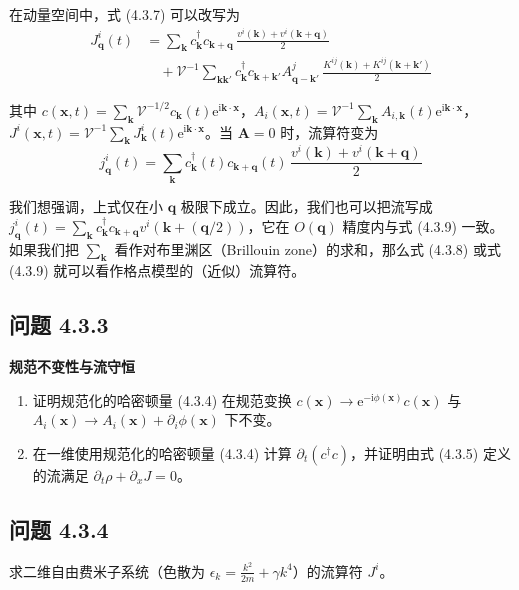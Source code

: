 在动量空间中，式 (4.3.7) 可以改写为
\begin{align*}
J^i_{\pmb{q}}(t) &= \sum_{\pmb{k}} c^{\dagger}_{\pmb{k}}c_{\pmb{k}+\pmb{q}}\,\frac{v^i(\pmb{k})+v^i(\pmb{k}+\pmb{q})}{2}\\
&\quad + \mathcal{V}^{-1}\sum_{\pmb{k}\pmb{k}'} c^{\dagger}_{\pmb{k}}c_{\pmb{k}+\pmb{k}'}A^j_{\pmb{q}-\pmb{k}'}\,\frac{K^{ij}(\pmb{k})+K^{ij}(\pmb{k}+\pmb{k}')}{2} \tag{4.3.8}
\end{align*}

其中 $c(\pmb{x},t)=\sum_{\pmb{k}}\mathcal{V}^{-1/2}c_{\pmb{k}}(t)\mathrm{e}^{\mathrm{i}\pmb{k}\cdot\pmb{x}}$，$A_i(\pmb{x},t)=\mathcal{V}^{-1}\sum_{\pmb{k}}A_{i,\pmb{k}}(t)\mathrm{e}^{\mathrm{i}\pmb{k}\cdot\pmb{x}}$，$J^i(\pmb{x},t)=\mathcal{V}^{-1}\sum_{\pmb{k}}J^i_{\pmb{k}}(t)\mathrm{e}^{\mathrm{i}\pmb{k}\cdot\pmb{x}}$。当 $\pmb{A}=0$ 时，流算符变为
\begin{equation*}
j^i_{\pmb{q}}(t) = \sum_{\pmb{k}} c^{\dagger}_{\pmb{k}}(t)c_{\pmb{k}+\pmb{q}}(t)\,\frac{v^i(\pmb{k})+v^i(\pmb{k}+\pmb{q})}{2} \tag{4.3.9}
\end{equation*}

我们想强调，上式仅在小 $\pmb{q}$ 极限下成立。因此，我们也可以把流写成 $j^i_{\pmb{q}}(t)=\sum_{\pmb{k}}c^{\dagger}_{\pmb{k}}c_{\pmb{k}+\pmb{q}}v^i(\pmb{k}+(\pmb{q}/2))$，它在 $O(\pmb{q})$ 精度内与式 (4.3.9) 一致。如果我们把 $\sum_{\pmb{k}}$ 看作对布里渊区（Brillouin zone）的求和，那么式 (4.3.8) 或式 (4.3.9) 就可以看作格点模型的（近似）流算符。

\subsection*{问题 4.3.3}

\textbf{规范不变性与流守恒}
\begin{enumerate}
\item 证明规范化的哈密顿量 (4.3.4) 在规范变换 $c(\pmb{x})\to\mathrm{e}^{-\mathrm{i}\phi(\pmb{x})}c(\pmb{x})$ 与 $A_i(\pmb{x})\to A_i(\pmb{x})+\partial_i\phi(\pmb{x})$ 下不变。
\item 在一维使用规范化的哈密顿量 (4.3.4) 计算 $\partial_t(c^{\dagger}c)$，并证明由式 (4.3.5) 定义的流满足 $\partial_t\rho+\partial_x J=0$。
\end{enumerate}

\subsection*{问题 4.3.4}

求二维自由费米子系统（色散为 $\epsilon_k=\frac{k^2}{2m}+\gamma k^4$）的流算符 $J^i$。

